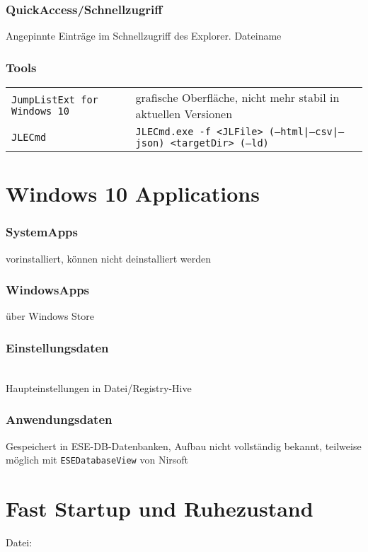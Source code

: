 \begin{multicols}{3}
\subsubsection{QuickAccess/Schnellzugriff}
Angepinnte Einträge im Schnellzugriff des Explorer. Dateiname 

\subsubsection{Tools}
\begin{tabular}{@{}p{\the\MyLen}%
		@{}p{\linewidth-\the\MyLen}@{}}
	\texttt{JumpListExt for Windows 10} & grafische Oberfläche, nicht mehr stabil in aktuellen Versionen\\
	\texttt{JLECmd} & \texttt{JLECmd.exe -f <JLFile> (--html|--csv|--json) <targetDir> (--ld)}\\
\end{tabular}

\section{Windows 10 Applications}
\subsubsection{SystemApps}
vorinstalliert, können nicht deinstalliert werden\\
\subsubsection{WindowsApps}
über Windows Store
\subsubsection{Einstellungsdaten}
\\
Haupteinstellungen in Datei/Registry-Hive 
\subsubsection{Anwendungsdaten}
Gespeichert in ESE-DB-Datenbanken, Aufbau nicht vollständig bekannt, teilweise möglich mit \texttt{ESEDatabaseView} von Nirsoft

\section{Fast Startup und Ruhezustand}
Datei: 

\end{multicols}
